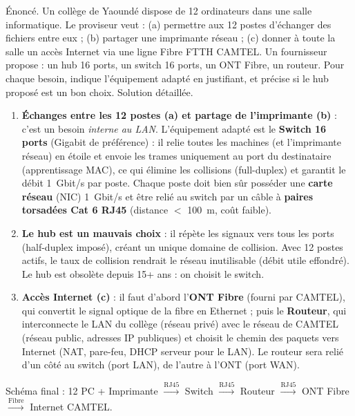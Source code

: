 \documentclass[11pt]{article}
\begin{document}
\begin{exoresolu}
Énoncé. Un collège de Yaoundé dispose de 12 ordinateurs dans une salle informatique. Le proviseur veut : (a) permettre aux 12 postes d'échanger des fichiers entre eux ; (b) partager une imprimante réseau ; (c) donner à toute la salle un accès Internet via une ligne Fibre FTTH CAMTEL. Un fournisseur propose : un hub 16 ports, un switch 16 ports, un ONT Fibre, un routeur. Pour chaque besoin, indique l'équipement adapté en justifiant, et précise si le hub proposé est un bon choix.
\tcblower
Solution détaillée.
\begin{enumerate}
\item \textbf{Échanges entre les 12 postes (a) et partage de l'imprimante (b)} : c'est un besoin \emph{interne au LAN}. L'équipement adapté est le \textbf{Switch 16 ports} (Gigabit de préférence) : il relie toutes les machines (et l'imprimante réseau) en étoile et envoie les trames uniquement au port du destinataire (apprentissage MAC), ce qui élimine les collisions (full-duplex) et garantit le débit \SI{1}{Gbit/s} par poste. Chaque poste doit bien sûr posséder une \textbf{carte réseau} (NIC) \SI{1}{Gbit/s} et être relié au switch par un câble à \textbf{paires torsadées Cat 6 RJ45} (distance $<$ \SI{100}{m}, coût faible).
\item \textbf{Le hub est un mauvais choix} : il répète les signaux vers tous les ports (half-duplex imposé), créant un unique domaine de collision. Avec 12 postes actifs, le taux de collision rendrait le réseau inutilisable (débit utile effondré). Le hub est obsolète depuis 15+ ans : on choisit le switch.
\item \textbf{Accès Internet (c)} : il faut d'abord l'\textbf{ONT Fibre} (fourni par CAMTEL), qui convertit le signal optique de la fibre en Ethernet ; puis le \textbf{Routeur}, qui interconnecte le LAN du collège (réseau privé) avec le réseau de CAMTEL (réseau public, adresses IP publiques) et choisit le chemin des paquets vers Internet (NAT, pare-feu, DHCP serveur pour le LAN). Le routeur sera relié d'un côté au switch (port LAN), de l'autre à l'ONT (port WAN).
\end{enumerate}
Schéma final : 12 PC + Imprimante $\xrightarrow{\text{RJ45}}$ Switch $\xrightarrow{\text{RJ45}}$ Routeur $\xrightarrow{\text{RJ45}}$ ONT Fibre $\xrightarrow{\text{Fibre}}$ Internet CAMTEL.
\end{exoresolu}
\end{document}

